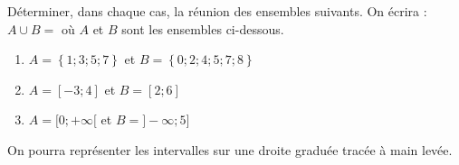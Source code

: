 
Déterminer, dans chaque cas, la réunion des ensembles suivants. On écrira : $A \cup B = $ où $A$ et $B$ sont les ensembles ci-dessous.
\begin{enumerate}
\item $A=\left\lbrace 1;3;5;7  \right\rbrace $ et $B=\left\lbrace 0;2;4;5;7;8  \right\rbrace $
\item $A=[-3;4]$ et $B=[2;6]$
\item $A=[0;+\infty[$ et $B=]-\infty;5]$
\end{enumerate}
On pourra représenter les intervalles sur une droite graduée tracée à main levée.